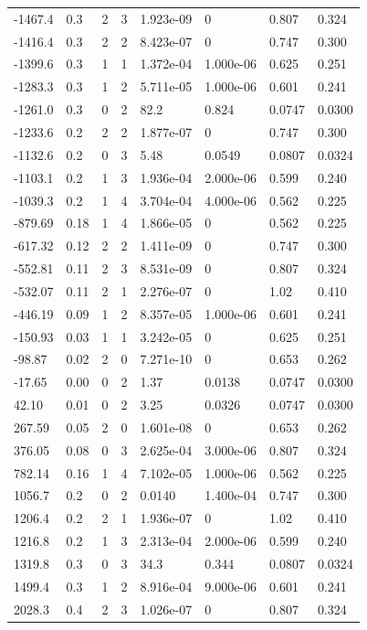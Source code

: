 \documentclass[preview]{standalone}
\begin{document}
{{\begin{tabular}{L{1.2cm}C{1.2cm} C{0.3cm}C{0.5cm} C{1.4cm}C{1.4cm} C{1.4cm}C{1.4cm}}
  -1467.4  &   0.3  & 2     &  3 &  1.923e-09  & 0  & 0.807 &  0.324   \\ 
  -1416.4  &   0.3  & 2     &  2 &  8.423e-07  & 0  & 0.747 &  0.300   \\ 
  -1399.6  &   0.3  & 1     &  1 &  1.372e-04  & 1.000e-06  & 0.625 &  0.251   \\ 
  -1283.3  &   0.3  & 1     &  2 &  5.711e-05  & 1.000e-06  & 0.601 &  0.241   \\ 
  -1261.0  &   0.3  & 0     &  2 &  82.2  & 0.824  & 0.0747 &  0.0300   \\ 
  -1233.6  &   0.2  & 2     &  2 &  1.877e-07  & 0  & 0.747 &  0.300   \\ 
  -1132.6  &   0.2  & 0     &  3 &  5.48  & 0.0549  & 0.0807 &  0.0324   \\ 
  -1103.1  &   0.2  & 1     &  3 &  1.936e-04  & 2.000e-06  & 0.599 &  0.240   \\ 
  -1039.3  &   0.2  & 1     &  4 &  3.704e-04  & 4.000e-06  & 0.562 &  0.225   \\ 
  -879.69  &  0.18  & 1     &  4 &  1.866e-05  & 0  & 0.562 &  0.225   \\ 
  -617.32  &  0.12  & 2     &  2 &  1.411e-09  & 0  & 0.747 &  0.300   \\ 
  -552.81  &  0.11  & 2     &  3 &  8.531e-09  & 0  & 0.807 &  0.324   \\ 
  -532.07  &  0.11  & 2     &  1 &  2.276e-07  & 0  & 1.02 &  0.410   \\ 
  -446.19  &  0.09  & 1     &  2 &  8.357e-05  & 1.000e-06  & 0.601 &  0.241   \\ 
  -150.93  &  0.03  & 1     &  1 &  3.242e-05  & 0  & 0.625 &  0.251   \\ 
  -98.87  &  0.02  & 2     &  0 &  7.271e-10  & 0  & 0.653 &  0.262   \\ 
  -17.65  &  0.00  & 0     &  2 &  1.37  & 0.0138  & 0.0747 &  0.0300   \\ 
  42.10  &  0.01  & 0     &  2 &  3.25  & 0.0326  & 0.0747 &  0.0300   \\ 
  267.59  &  0.05  & 2     &  0 &  1.601e-08  & 0  & 0.653 &  0.262   \\ 
  376.05  &  0.08  & 0     &  3 &  2.625e-04  & 3.000e-06  & 0.807 &  0.324   \\ 
  782.14  &  0.16  & 1     &  4 &  7.102e-05  & 1.000e-06  & 0.562 &  0.225   \\ 
  1056.7  &   0.2  & 0     &  2 &  0.0140  & 1.400e-04  & 0.747 &  0.300   \\ 
  1206.4  &   0.2  & 2     &  1 &  1.936e-07  & 0  & 1.02 &  0.410   \\ 
  1216.8  &   0.2  & 1     &  3 &  2.313e-04  & 2.000e-06  & 0.599 &  0.240   \\ 
  1319.8  &   0.3  & 0     &  3 &  34.3  & 0.344  & 0.0807 &  0.0324   \\ 
  1499.4  &   0.3  & 1     &  2 &  8.916e-04  & 9.000e-06  & 0.601 &  0.241   \\ 
  2028.3  &   0.4  & 2     &  3 &  1.026e-07  & 0  & 0.807 &  0.324   \\ 
\hline 
\end{tabular} 

}}
\end{document}
